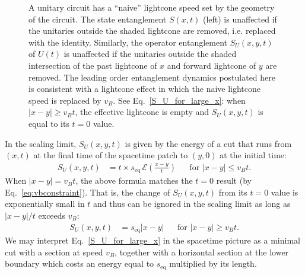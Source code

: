 \documentclass[aps,prx,twocolumn,superscriptaddress,floatfix,nofootinbib,prx]{revtex4}
\newcommand{\f}{\frac}
\renewcommand{\>}{\right\rangle}
\newcommand{\<}{\left\langle}
\newcommand{\ba}{\begin{align}}
\newcommand{\lf}{\left(}
\newcommand{\ri}{\right)}
\newcommand{\seq}{s_\text{eq}}
\newcommand{\lt}{\mathcal{E}}
\begin{document}
\begin{figure}[b]
\caption{A unitary circuit has a ``naive'' lightcone speed set by the geometry of the circuit. The state entanglement  $S(x,t)$ (left)  is unaffected if the unitaries outside the shaded lightcone are removed, i.e. replaced with the identity. Similarly, the operator entanglement $S_U(x,y,t)$ of $U(t)$ is unaffected if the  unitaries outside the shaded intersection of the past lightcone of $x$ and forward lightcone of $y$ are removed. The leading order entanglement dynamics postulated here is consistent with a lightcone effect in which the naive lightcone speed is replaced by $v_B$. See Eq.~\ref{S_U_for_large_x}: when $|x-y|\geq v_Bt$, the effective lightcone is empty and $S_U(x,y,t)$ is equal to its $t=0$ value.
}
 \label{fig:lightcones}
\end{figure}


 In the scaling limit, $S_{U}(x,y,t)$ is given by the energy of a cut that runs from $(x,t)$ at the final time of the spacetime patch to $(y,0)$ at the initial time:
\ba\label{eq:SU1}
S_{U}(x,y,t) & = t\times \seq\,\lt\lf \f{x-y}{t}\ri & 
& \text{for $|x-y|\leq v_B t$}.
\end{align}
When $|x-y|=v_B t$, the above formula matches the $t=0$ result (by Eq.~\ref{eq:vbconstraint}).
That is, the change of $S_U(x,y,t)$ 
from its $t=0$ value is exponentially small \cite{lr} in $t$ and thus can be ignored in the scaling limit as long as $|x-y|/t$ exceeds $v_B$:
\ba\label{S_U_for_large_x}
S_{U}(x,y,t) & = \seq |x-y| & 
& \text{for $|x-y| \geq  v_B t$}.
\end{align}
We may interpret Eq.~\ref{S_U_for_large_x} in the spacetime picture as  a minimal cut with a section at speed $v_B$, together with a horizontal section at the lower boundary which costs an energy equal to $\seq$ multiplied by its length.
\end{document}
